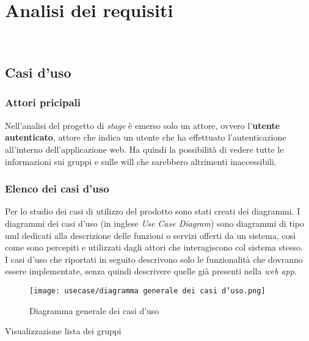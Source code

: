 
\chapter{Analisi dei requisiti}
\label{cap:analisi-requisiti}

\\

\section{Casi d'uso}
\subsection*{Attori pricipali}
Nell'analisi del progetto di \textit{stage} è emerso solo un attore, ovvero l'\textbf{utente autenticato}, 
attore che indica un utente che ha effettuato l'autenticazione
all'interno dell'applicazione web. Ha quindi la possibilità di vedere tutte le
informazioni sui gruppi e sulle \gls{will}  che sarebbero altrimenti inaccessibili. 

\subsection*{Elenco dei casi d'uso}
Per lo studio dei casi di utilizzo del prodotto sono stati creati dei diagrammi.
I diagrammi dei casi d'uso (in inglese \emph{Use Case Diagram}) sono diagrammi di tipo \gls{uml} dedicati alla descrizione delle funzioni o servizi offerti da un sistema, così come sono percepiti e utilizzati dagli attori che interagiscono col sistema stesso.\\
I casi d'uso che riportati in seguito descrivono solo le funzionalità che dovranno essere implementate, senza quindi descrivere quelle già presenti nella \textit{web app}. 
\begin{figure}[H] 
    \centering 
    \texttt{[image: usecase/diagramma generale dei casi d'uso.png]} 
    \caption{Diagramma generale dei casi d'uso}
\end{figure}

\begin{usecase}{Visualizzazione lista dei gruppi}
    \label{uc:scenario-visualizzazione-lista-gruppi}
\end{usecase}
\newpage


